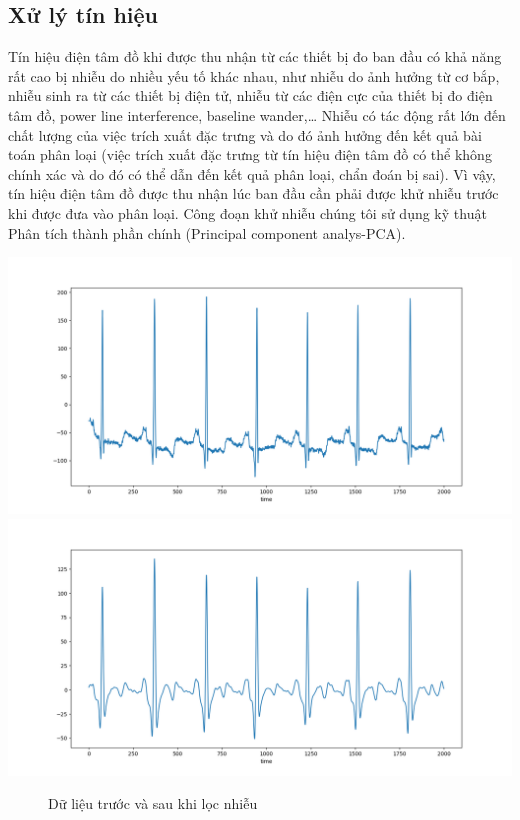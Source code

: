 \subsection{Xử lý tín hiệu}
Tín hiệu điện tâm đồ khi được thu nhận từ các thiết bị đo ban đầu có khả năng rất cao bị nhiễu do nhiều yếu tố khác nhau, như nhiễu do ảnh hưởng từ cơ bắp, nhiễu sinh ra từ các thiết bị điện tử, nhiễu từ các điện cực của thiết bị đo điện tâm đồ, power line interference, baseline wander,… Nhiễu có tác động rất lớn đến chất lượng của việc trích xuất đặc trưng và do đó ảnh hưởng đến kết quả bài toán phân loại (việc trích xuất đặc trưng từ tín hiệu điện tâm đồ có thể không chính xác và do đó có thể dẫn đến kết quả phân loại, chẩn đoán bị sai). Vì vậy, tín hiệu điện tâm đồ được thu nhận lúc ban đầu cần phải được khử nhiễu trước khi được đưa vào phân loại. Công đoạn khử nhiễu chúng tôi sử dụng kỹ thuật Phân tích thành phần chính (Principal component analys-PCA).
\begin{center}
        \includegraphics[width=.9\linewidth]{image/chapter5/noise.png}
        \includegraphics[width=.9\linewidth]{image/chapter5/hlp.png}
    \begin{figure}[!htb]
       \caption{Dữ liệu trước và sau khi lọc nhiễu}
    \end{figure}
\end{center}

